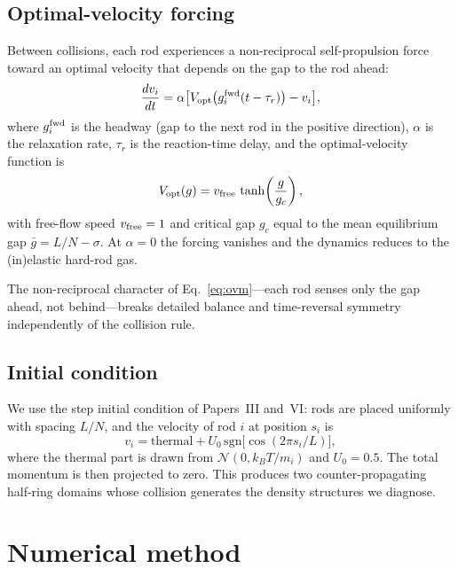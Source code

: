\documentclass[aps,pre,twocolumn,superscriptaddress,longbibliography,floatfix]{revtex4-2}
\begin{document}
\subsection{Optimal-velocity forcing}
\label{sec:ovm}

Between collisions, each rod experiences a non-reciprocal
self-propulsion force toward an optimal velocity that depends on
the gap to the rod ahead:
\begin{equation}
\frac{dv_i}{dt} = \alpha\bigl[V_{\rm opt}\bigl(g_i^{\rm fwd}(t - \tau_r)\bigr) - v_i\bigr],
\label{eq:ovm}
\end{equation}
where $g_i^{\rm fwd}$ is the headway (gap to the next rod in the
positive direction), $\alpha$ is the relaxation rate, $\tau_r$ is
the reaction-time delay, and the optimal-velocity function is
\begin{equation}
V_{\rm opt}(g) = v_{\rm free}\,\tanh\!\left(\frac{g}{g_c}\right),
\label{eq:Vopt}
\end{equation}
with free-flow speed $v_{\rm free} = 1$ and critical gap $g_c$
equal to the mean equilibrium gap $\bar g = L/N - \sigma$. At
$\alpha = 0$ the forcing vanishes and the dynamics reduces to
the (in)elastic hard-rod gas.

The non-reciprocal character of Eq.~\eqref{eq:ovm}---each rod
senses only the gap ahead, not behind---breaks detailed balance
and time-reversal symmetry independently of the collision rule.

\subsection{Initial condition}
\label{sec:ic}

We use the step initial condition of Papers~III
and~VI: rods are placed uniformly with spacing $L/N$,
and the velocity of rod $i$ at position $s_i$ is
\begin{equation}
v_i = \text{thermal} + U_0\,\text{sgn}\!\bigl[\cos(2\pi s_i/L)\bigr],
\label{eq:step_ic}
\end{equation}
where the thermal part is drawn from $\mathcal{N}(0,
k_BT/m_i)$ and $U_0 = 0.5$. The total momentum is then
projected to zero. This produces two counter-propagating
half-ring domains whose collision generates the density
structures we diagnose.

\section{Numerical method}
\label{sec:method}
\end{document}
